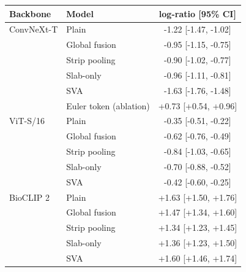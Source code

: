 \begin{tabular}{llc}
\toprule
Backbone & Model & log-ratio [95\% CI] \\
\midrule
ConvNeXt-T & Plain & -1.22 [-1.47, -1.02] \\
 & Global fusion & -0.95 [-1.15, -0.75] \\
 & Strip pooling & -0.90 [-1.02, -0.77] \\
 & Slab-only & -0.96 [-1.11, -0.81] \\
 & SVA & -1.63 [-1.76, -1.48] \\
 & Euler token (ablation) & +0.73 [+0.54, +0.96] \\
\midrule
ViT-S/16 & Plain & -0.35 [-0.51, -0.22] \\
 & Global fusion & -0.62 [-0.76, -0.49] \\
 & Strip pooling & -0.84 [-1.03, -0.65] \\
 & Slab-only & -0.70 [-0.88, -0.52] \\
 & SVA & -0.42 [-0.60, -0.25] \\
\midrule
BioCLIP 2 & Plain & +1.63 [+1.50, +1.76] \\
 & Global fusion & +1.47 [+1.34, +1.60] \\
 & Strip pooling & +1.34 [+1.23, +1.45] \\
 & Slab-only & +1.36 [+1.23, +1.50] \\
 & SVA & +1.60 [+1.46, +1.74] \\
\bottomrule
\end{tabular}